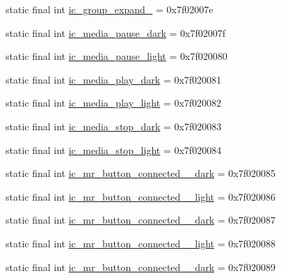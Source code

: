 \begin{CompactItemize}
\item 
static final int \hyperlink{classandroid_1_1support_1_1v7_1_1palette_1_1_r_1_1drawable_95f7b7e6c61c232b8f96c12b157ccc59}{ic\_\-group\_\-expand\_} = 0x7f02007e
\item 
static final int \hyperlink{classandroid_1_1support_1_1v7_1_1palette_1_1_r_1_1drawable_4430c2e6ea35f1322cd18ed8301b04ef}{ic\_\-media\_\-pause\_\-dark} = 0x7f02007f
\item 
static final int \hyperlink{classandroid_1_1support_1_1v7_1_1palette_1_1_r_1_1drawable_2f63d85b9dbde8222cc050b364419ab7}{ic\_\-media\_\-pause\_\-light} = 0x7f020080
\item 
static final int \hyperlink{classandroid_1_1support_1_1v7_1_1palette_1_1_r_1_1drawable_7b0bbe322f9d875a6d2e3a4c5130a6c2}{ic\_\-media\_\-play\_\-dark} = 0x7f020081
\item 
static final int \hyperlink{classandroid_1_1support_1_1v7_1_1palette_1_1_r_1_1drawable_61dc755257871ace76822dcf5fc6ccf1}{ic\_\-media\_\-play\_\-light} = 0x7f020082
\item 
static final int \hyperlink{classandroid_1_1support_1_1v7_1_1palette_1_1_r_1_1drawable_1cc58c9f9b40590cfbb8ab8748685a62}{ic\_\-media\_\-stop\_\-dark} = 0x7f020083
\item 
static final int \hyperlink{classandroid_1_1support_1_1v7_1_1palette_1_1_r_1_1drawable_8ed60df74ffb29eeea5276c2ec384129}{ic\_\-media\_\-stop\_\-light} = 0x7f020084
\item 
static final int \hyperlink{classandroid_1_1support_1_1v7_1_1palette_1_1_r_1_1drawable_595b792719ad4b9596c641bd78218733}{ic\_\-mr\_\-button\_\-connected\_\_\-dark} = 0x7f020085
\item 
static final int \hyperlink{classandroid_1_1support_1_1v7_1_1palette_1_1_r_1_1drawable_c9dd820867d288508885833df8fb33c9}{ic\_\-mr\_\-button\_\-connected\_\_\-light} = 0x7f020086
\item 
static final int \hyperlink{classandroid_1_1support_1_1v7_1_1palette_1_1_r_1_1drawable_1b2f02100b21eb9b1d44f03f8444cc57}{ic\_\-mr\_\-button\_\-connected\_\_\-dark} = 0x7f020087
\item 
static final int \hyperlink{classandroid_1_1support_1_1v7_1_1palette_1_1_r_1_1drawable_b26bf4193a286d8f1d89b61b3015f211}{ic\_\-mr\_\-button\_\-connected\_\_\-light} = 0x7f020088
\item 
static final int \hyperlink{classandroid_1_1support_1_1v7_1_1palette_1_1_r_1_1drawable_7943a453e694e292c1a2b7c210e3f9bf}{ic\_\-mr\_\-button\_\-connected\_\_\-dark} = 0x7f020089

\end{CompactItemize}
